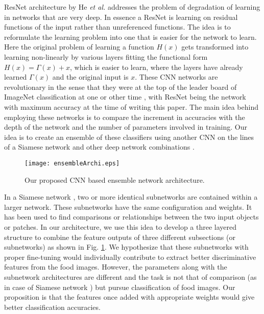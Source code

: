 \documentclass[journal]{IEEEtran}%
\begin{document}
ResNet architecture by He \emph{et al.} \cite{He4} addresses the problem of degradation of learning in networks that are very deep. In essence a ResNet is learning on residual functions of the input rather than unreferenced functions. The idea is to reformulate the learning problem into one that is easier for the network to learn. Here the original problem of learning a function $H(x)$ gets transformed into learning non-linearly by various layers fitting the functional form $H(x) = \Gamma(x) + x$, which is easier to learn, where the layers have already learned $\Gamma(x)$ and the original input is $x$. These CNN networks are revolutionary in the sense that they were at the top of the leader board of ImageNet classification at one or other time \cite{Olga1}, with ResNet being the network with maximum accuracy at the time of writing this paper. The main idea behind employing these networks is to compare the increment in accuracies with the depth of the network and the number of parameters involved in training. Our idea is to create an ensemble of these classifiers using another CNN on the lines of a Siamese network \cite{Bromley1} and other deep network combinations \cite{Zuo1}.
\begin{figure}
\centering
\texttt{[image: ensembleArchi.eps]}
\caption{Our proposed CNN based ensemble network architecture.} \label{Fig1:NetworkArchi}
\end{figure}

In a Siamese network \cite{Bromley1}, two or more identical subnetworks are contained within a larger network. These subnetworks have the same configuration and weights. It has been used to find comparisons or relationships between the two input objects or patches. In our architecture, we use this idea to develop a three layered structure to combine the feature outputs of three different subsections (or subnetworks) as shown in Fig. \ref{Fig1:NetworkArchi}. We hypothesize that these subnetworks with proper fine-tuning would individually contribute to extract better discriminative features from the food images. However, the parameters along with the subnetwork architectures are different and the task is not that of comparison (as in case of Siamese network \cite{Bromley1}) but pursue classification of food images. Our proposition is that the features once added with appropriate weights would give better classification accuracies.
\end{document}
